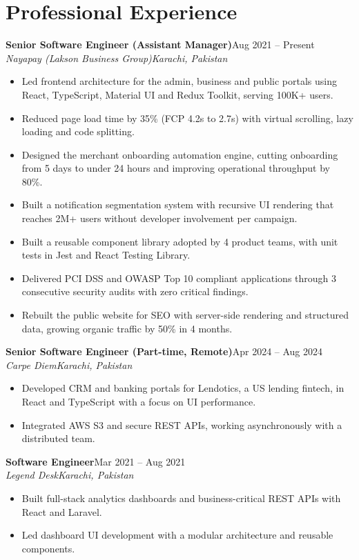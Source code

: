 \documentclass[10.5pt,a4paper]{article}
\newcommand{\role}[4]{%
  \vspace{4pt}\textbf{#1}\hfill #2\\
  \textit{#3}\hfill \textit{#4}\par\vspace{1pt}}
\begin{document}
\section{Professional Experience}

\role{Senior Software Engineer (Assistant Manager)}{Aug 2021 -- Present}{Nayapay (Lakson Business Group)}{Karachi, Pakistan}
\begin{itemize}
  \item Led frontend architecture for the admin, business and public portals using React, TypeScript, Material UI and Redux Toolkit, serving 100K+ users.
  \item Reduced page load time by 35\% (FCP 4.2s to 2.7s) with virtual scrolling, lazy loading and code splitting.
  \item Designed the merchant onboarding automation engine, cutting onboarding from 5 days to under 24 hours and improving operational throughput by 80\%.
  \item Built a notification segmentation system with recursive UI rendering that reaches 2M+ users without developer involvement per campaign.
  \item Built a reusable component library adopted by 4 product teams, with unit tests in Jest and React Testing Library.
  \item Delivered PCI DSS and OWASP Top 10 compliant applications through 3 consecutive security audits with zero critical findings.
  \item Rebuilt the public website for SEO with server-side rendering and structured data, growing organic traffic by 50\% in 4 months.
\end{itemize}

\role{Senior Software Engineer (Part-time, Remote)}{Apr 2024 -- Aug 2024}{Carpe Diem}{Karachi, Pakistan}
\begin{itemize}
  \item Developed CRM and banking portals for Lendotics, a US lending fintech, in React and TypeScript with a focus on UI performance.
  \item Integrated AWS S3 and secure REST APIs, working asynchronously with a distributed team.
\end{itemize}

\role{Software Engineer}{Mar 2021 -- Aug 2021}{Legend Desk}{Karachi, Pakistan}
\begin{itemize}
  \item Built full-stack analytics dashboards and business-critical REST APIs with React and Laravel.
  \item Led dashboard UI development with a modular architecture and reusable components.
\end{itemize}
\end{document}
